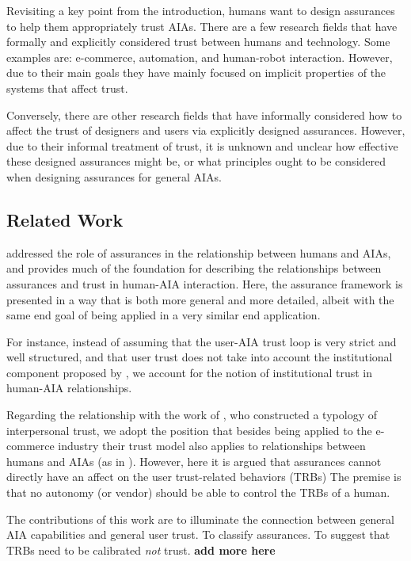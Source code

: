     Revisiting a key point from the introduction, humans want to design assurances to help them appropriately trust AIAs. There are a few research fields that have formally and explicitly considered trust between humans and technology. Some examples are: e-commerce, automation, and human-robot interaction. However, due to their main goals they have mainly focused on implicit properties of the systems that affect trust.

    Conversely, there are other research fields that have informally considered how to affect the trust of designers and users via explicitly designed assurances. However, due to their informal treatment of trust, it is unknown and unclear how effective these designed assurances might be, or what principles ought to be considered when designing assurances for general AIAs.

    

\subsection{Related Work}
    \citet{Lillard2016-yg} addressed the role of assurances in the relationship between humans and AIAs, and provides much of the foundation for describing the relationships between assurances and trust in human-AIA interaction. Here, the assurance framework is presented in a way that is both more general and more detailed, albeit with the same end goal of being applied in a very similar end application. 
    
    For instance, instead of assuming that the user-AIA trust loop is very strict and well structured, and that user trust does not take into account the institutional component proposed by \citet{McKnight2001-fa}, we account for the notion of institutional trust in  human-AIA relationships.

    Regarding the relationship with the work of \citet{McKnight2001-fa}, who constructed a typology of interpersonal trust,  we adopt the position that besides being applied to the e-commerce industry their trust model also applies to relationships between humans and AIAs (as in \citet{Lillard2016-yg}). However, here it is argued that assurances cannot directly have an affect on the user trust-related behaviors (TRBs) The premise is that no autonomy (or vendor) should be able to control the TRBs of a human.

    The contributions of this work are to illuminate the connection between general AIA capabilities and general user trust. To classify assurances. To suggest that TRBs need to be calibrated \emph{not} trust. \textbf{add more here} 

